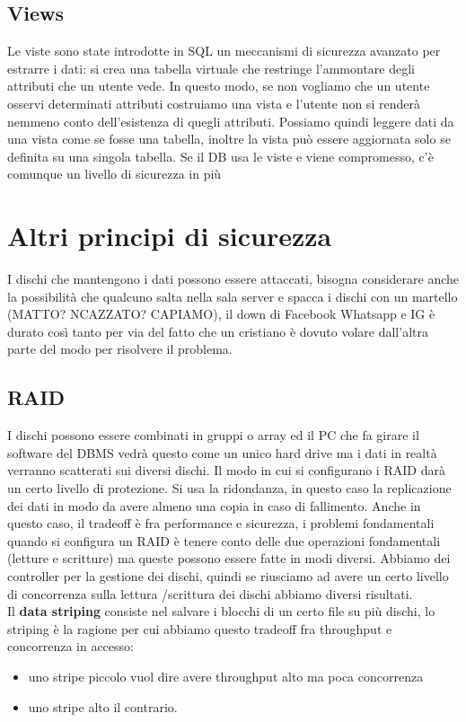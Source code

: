 \documentclass[12pt, oneside]{extbook} %
\begin{document}
\subsection{Views}
Le viste sono state introdotte in SQL un meccanismi di sicurezza avanzato per estrarre i dati: si crea una tabella virtuale che restringe l'ammontare degli attributi che un utente vede. In questo modo, se non vogliamo che un utente osservi determinati attributi costruiamo una vista e l'utente non si renderà nemmeno conto dell'esistenza di quegli attributi. Possiamo quindi leggere dati da una vista come se fosse una tabella, inoltre la vista può essere aggiornata solo se definita su una singola tabella. Se il DB usa le viste e viene compromesso, c'è comunque un livello di sicurezza in più

\section{Altri principi di sicurezza}
I dischi che mantengono i dati possono essere attaccati, bisogna considerare anche la possibilità che qualcuno salta nella sala server e spacca i dischi con un martello (MATTO? NCAZZATO? CAPIAMO), il down di Facebook Whatsapp e IG è durato così tanto per via del fatto che un cristiano è dovuto volare dall'altra parte del modo per risolvere il problema.
\subsection{RAID}
I dischi possono essere combinati in gruppi o array ed il PC che fa girare il software del DBMS vedrà questo come un unico hard drive ma i dati in realtà verranno scatterati sui diversi dischi. Il modo in cui si configurano i RAID darà un certo livello di protezione. Si usa la ridondanza, in questo caso la replicazione dei dati in modo da avere almeno una copia in caso di fallimento. Anche in questo caso, il tradeoff è fra performance e sicurezza, i problemi fondamentali quando si configura un RAID è tenere conto delle due operazioni fondamentali (letture e scritture) ma queste possono essere fatte in modi diversi. Abbiamo dei controller per la gestione dei dischi, quindi se riusciamo ad avere un certo livello di concorrenza sulla lettura /scrittura dei dischi abbiamo diversi risultati.\\Il \textbf{data striping} consiste nel salvare i blocchi di un certo file su più dischi, lo striping è la ragione per cui abbiamo questo tradeoff fra throughput e concorrenza in accesso:
\begin{itemize}
	\item uno stripe piccolo vuol dire avere throughput alto ma poca concorrenza
	\item uno stripe alto il contrario.
\end{itemize}
\end{document}
